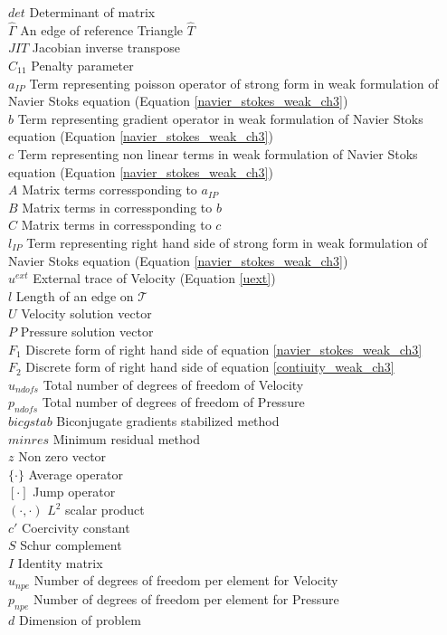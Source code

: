 \documentclass[a4paper,12pt]{book}
\begin{document}
$det$ Determinant of matrix \\
$\hat{\Gamma}$ An edge of reference Triangle $\hat{T}$\\
$JIT$ Jacobian inverse transpose\\
$C_{11}$ Penalty parameter \\
$a_{IP}$ Term representing poisson operator of strong form in weak formulation of Navier Stoks equation (Equation \eqref{navier_stokes_weak_ch3}) \\
$b$ Term representing gradient operator in weak formulation of Navier Stoks equation (Equation \eqref{navier_stokes_weak_ch3}) \\
$c$ Term representing non linear terms in weak formulation of Navier Stoks equation (Equation \eqref{navier_stokes_weak_ch3}) \\
$A$ Matrix terms corressponding to $a_{IP}$\\
$B$ Matrix terms in corressponding to $b$\\
$C$ Matrix terms in corressponding to $c$\\
$l_{IP}$ Term representing right hand side of strong form in weak formulation of Navier Stoks equation (Equation \eqref{navier_stokes_weak_ch3}) \\
$u^{ext}$ External trace of Velocity (Equation \ref{uext})\\
$l$ Length of an edge on $\mathcal{T}$\\
$U$ Velocity solution vector \\
$P$ Pressure solution vector\\
$F_1$ Discrete form of right hand side of equation \eqref{navier_stokes_weak_ch3}\\
$F_2$ Discrete form of right hand side of equation \eqref{contiuity_weak_ch3}\\
$u_{ndofs}$ Total number of degrees of freedom of Velocity\\
$p_{ndofs}$ Total number of degrees of freedom of Pressure\\
$bicgstab$ Biconjugate gradients stabilized method\\
$minres$ Minimum residual method\\
$z$ Non zero vector\\
$\lbrace \cdot \rbrace$ Average operator\\
$[\cdot]$ Jump operator\\
$(\cdot,\cdot)$ $L^2$ scalar product\\
$c'$ Coercivity constant\\
$S$ Schur complement\\
$I$ Identity matrix\\
$u_{npe}$ Number of degrees of freedom per element for Velocity\\
$p_{npe}$ Number of degrees of freedom per element for Pressure\\
$d$ Dimension of problem\\
\end{document}
